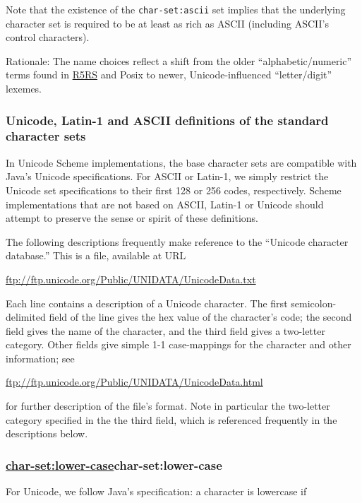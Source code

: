 Note that the existence of the \texttt{char-set:ascii} set implies that
the underlying character set is required to be at least as rich as ASCII
(including ASCII's control characters).

Rationale: The name choices reflect a shift from the older
``alphabetic/numeric'' terms found in \protect\hyperlink{R5RS}{R5RS} and
Posix to newer, Unicode-influenced ``letter/digit'' lexemes.

\subsubsection{Unicode, Latin-1 and ASCII definitions of the standard character sets}


In Unicode Scheme implementations, the base character sets are
compatible with Java's Unicode specifications. For ASCII or Latin-1, we
simply restrict the Unicode set specifications to their first 128 or 256
codes, respectively. Scheme implementations that are not based on ASCII,
Latin-1 or Unicode should attempt to preserve the sense or spirit of
these definitions.

The following descriptions frequently make reference to the ``Unicode
character database.'' This is a file, available at URL

\url{ftp://ftp.unicode.org/Public/UNIDATA/UnicodeData.txt}

Each line contains a description of a Unicode character. The first
semicolon-delimited field of the line gives the hex value of the
character's code; the second field gives the name of the character, and
the third field gives a two-letter category. Other fields give simple
1-1 case-mappings for the character and other information; see

\url{ftp://ftp.unicode.org/Public/UNIDATA/UnicodeData.html}

for further description of the file's format. Note in particular the
two-letter category specified in the the third field, which is
referenced frequently in the descriptions below.

\subsubsection{{\href{}{char-set:lower-case}}{char-set:lower-case}}\label{char-setlower-case}

For Unicode, we follow Java's specification: a character is lowercase if

